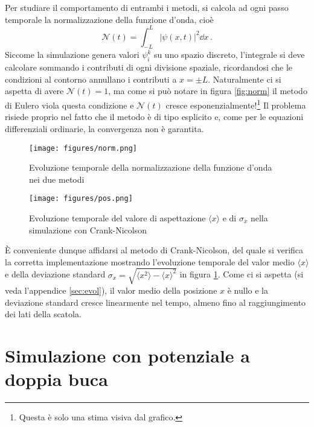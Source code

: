 \documentclass[a4paper, titlepage]{article}
\numberwithin{equation}{section}
\begin{document}
Per studiare il comportamento di entrambi i metodi, si calcola ad ogni passo temporale la normalizzazione della funzione d'onda, cioè
\[
    \mathcal{N}(t) = \int_{-L}^L |\psi(x,t)|^2 \dd{x}\, .
\]
Siccome la simulazione genera valori $\psi_i^k$ su uno spazio discreto, l'integrale si deve calcolare sommando i contributi di ogni divisione spaziale, ricordandosi che le condizioni al contorno annullano i contributi a $x = \pm L$.
Naturalmente ci si aspetta di avere $\mathcal{N}(t) = 1$, ma come si può notare in figura \ref{fig:norm} il metodo di Eulero viola questa condizione e $\mathcal{N}(t)$ cresce esponenzialmente!\footnote{Questa è solo una stima visiva dal grafico.}
Il problema risiede proprio nel fatto che il metodo è di tipo esplicito e, come per le equazioni differenziali ordinarie, la convergenza non è garantita. 

\begin{figure}[h!]
    \centering
    \begin{minipage}{0.47 \textwidth}
        \centering
        \texttt{[image: figures/norm.png]}
        \caption{Evoluzione temporale della normalizzazione della funzione d'onda nei due metodi}
        \label{fig:norm}
    \end{minipage}
    \hspace{0.02\textwidth}
    \begin{minipage}{0.47 \textwidth}
        \centering
        \texttt{[image: figures/pos.png]}
        \caption{Evoluzione temporale del valore di aspettazione $\langle x \rangle$ e di $\sigma_x$ nella simulazione con Crank-Nicolson}
        \label{fig:pos}
    \end{minipage}
\end{figure}

È conveniente dunque affidarsi al metodo di Crank-Nicolson, del quale si verifica la corretta implementazione mostrando l'evoluzione temporale del valor medio $\langle x \rangle$ e della deviazione standard $\sigma_x = \sqrt{\langle x^2 \rangle - \langle x \rangle^2}$ in figura \ref{fig:pos}. Come ci si aspetta (si veda l'appendice \ref{sec:evol}), il valor medio della posizione $x$ è nullo e la deviazione standard cresce linearmente nel tempo, almeno fino al raggiungimento dei lati della scatola.


\section{Simulazione con potenziale a doppia buca}
\end{document}
